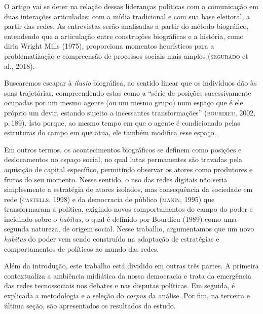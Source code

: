 O artigo vai se deter na relação dessas lideranças políticas com a
comunicação em duas interações articuladas: com a mídia tradicional e
com sua base eleitoral, a partir das redes. As entrevistas serão
analisadas a partir do método biográfico, entendendo que a articulação
entre construções biográficas e a história, como diria Wright Mills
(1975), proporciona momentos heurísticos para a problematização e
compreensão de processos sociais mais amplos (\textsc{segurado} et al., 2018).

Buscaremos escapar à \textit{ilusio} biográfica, ao sentido linear que os
indivíduos dão às suas trajetórias, compreendendo estas como a ``série
de posições sucessivamente ocupadas por um mesmo agente (ou um mesmo
grupo) num espaço que é ele próprio um devir, estando sujeito a
incessantes transformações'' (\textsc{bourdieu}, 2002, p.\,189). Isto porque, ao
mesmo tempo em que o agente é condicionado pelas estruturas do campo em
que atua, ele também modifica esse espaço.

Em outros termos, os acontecimentos biográficos se definem como posições
e deslocamentos no espaço social, no qual lutas permanentes são travadas
pela aquisição de capital específico, permitindo observar os atores como
produtores e frutos do seu momento. Nesse sentido, o uso das redes
digitais não seria simplesmente a estratégia de atores isolados, mas
consequência da sociedade em rede (\textsc{castells}, 1998) e da democracia de
público (\textsc{manin}, 1995) que transformaram a política, exigindo novos
comportamentos do campo do poder e incidindo sobre o \textit{habitus}, o
qual é definido por Bourdieu (1989) como uma segunda natureza, de origem
social. Nesse trabalho, argumentamos que um novo \textit{habitus} do poder
vem sendo construído na adaptação de estratégias e comportamentos de
políticos ao mundo das redes.

Além da introdução, este trabalho está dividido em outras três partes. A
primeira contextualiza a ambiência midiática da nossa democracia e trata
da emergência das redes tecnossociais nos debates e nas disputas
políticas. Em seguida, é explicada a metodologia e a seleção do
\textit{corpus} da análise. Por fim, na terceira e última seção, são
apresentados os resultados do estudo.


